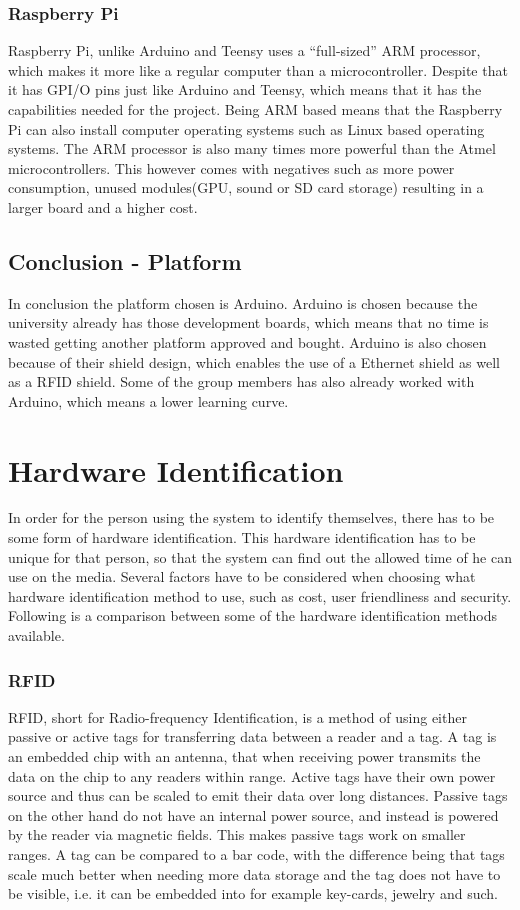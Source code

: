 \subsubsection{Raspberry Pi}
Raspberry Pi, unlike Arduino and Teensy uses a ``full-sized'' ARM processor, which makes it more like a regular computer than a microcontroller. Despite that it has GPI/O pins just like Arduino and Teensy, which means that it has the capabilities needed for the project. Being ARM based means that the Raspberry Pi can also install computer operating systems such as Linux based operating systems. The ARM processor is also many times more powerful than the Atmel microcontrollers. This however comes with negatives such as more power consumption, unused modules(GPU, sound or SD card storage) resulting in a larger board and a higher cost. 

\subsection{Conclusion - Platform}
In conclusion the platform chosen is Arduino. Arduino is chosen because the university already has those development boards, which means that no time is wasted getting another platform approved and bought. Arduino is also chosen because of their shield design, which enables the use of a Ethernet shield as well as a RFID shield. Some of the group members has also already worked with Arduino, which means a lower learning curve.

\section{Hardware Identification}
In order for the person using the system to identify themselves, there has to be some form of hardware identification. This hardware identification has to be unique for that person, so that the system can find out the allowed time of he can use on the media. Several factors have to be considered when choosing what hardware identification method to use, such as cost, user friendliness and security. Following is a comparison between some of the hardware identification methods available.

\subsubsection{RFID}
RFID,  short for Radio-frequency Identification, is a method of using either passive or active tags for transferring data between a reader and a tag. A tag is an embedded chip with an antenna, that when receiving power transmits the data on the chip to any readers within range. Active tags have their own power source and thus can be scaled to emit their data over long distances. Passive tags on the other hand do not have an internal power source, and instead is powered by the reader via magnetic fields. This makes passive tags work on smaller ranges. A tag can be compared to a bar code, with the difference being that tags scale much better when needing more data storage and the tag does not have to be visible, i.e. it can be embedded into for example key-cards, jewelry and such.

